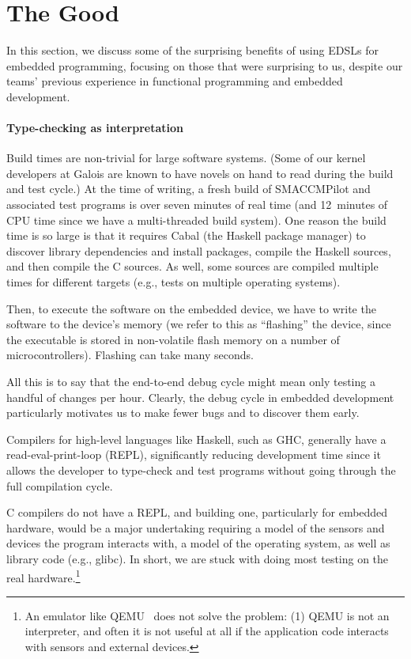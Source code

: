 \section{The Good}

In this section, we discuss some of the surprising benefits of using EDSLs for
embedded programming, focusing on those that were surprising to us, despite our
teams' previous experience in functional programming and embedded development.

\paragraph{Type-checking as interpretation}
Build times are non-trivial for large software systems.  (Some of our kernel
developers at Galois are known to have novels on hand to read during the build
and test cycle.)  At the time of writing, a fresh build of SMACCMPilot and
associated test programs is over seven minutes of real time (and 12~minutes of
CPU time since we have a multi-threaded build system).  One reason the build
time is so large is that it requires Cabal (the Haskell package manager) to
discover library dependencies and install packages, compile the Haskell sources,
and then compile the C sources.  As well, some sources are compiled multiple
times for different targets (e.g., tests on multiple operating systems).

Then, to execute the software on the embedded device, we have to write the
software to the device's memory (we refer to this as ``flashing'' the device,
since the executable is stored in non-volatile flash memory on a number of
microcontrollers).  Flashing can take many seconds.

All this is to say that the end-to-end debug cycle might mean only testing a
handful of changes per hour.  Clearly, the debug cycle in embedded development
particularly motivates us to make fewer bugs and to discover them early.

Compilers for high-level languages like Haskell, such as GHC, generally have a
read-eval-print-loop (REPL), significantly reducing development time since it
allows the developer to type-check and test programs without going through the
full compilation cycle.

C compilers do not have a REPL, and building one, particularly for embedded
hardware, would be a major undertaking requiring a model of the sensors and
devices the program interacts with, a model of the operating system, as well as
library code (e.g., glibc).  In short, we are stuck with doing most testing on
the real hardware.\footnote{An emulator like QEMU~\cite{} does not solve the
  problem: (1) QEMU is not an interpreter, and often it is not useful at all if
  the application code interacts with sensors and external devices.}

